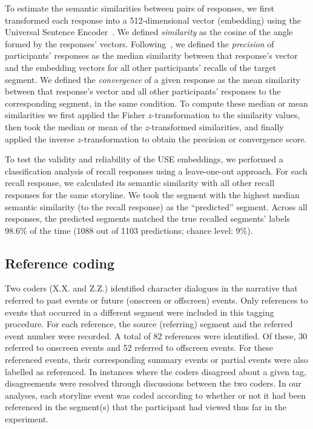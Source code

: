 \documentclass[10pt]{article}
\begin{document}
To estimate the semantic similarities between pairs of responses, we first
transformed each response into a 512-dimensional vector (embedding) using the
Universal Sentence Encoder~\citep[Transformer USE, ][]{CerEtal18}. We defined
\textit{similarity} as the cosine of the angle formed by the responses'
vectors. Following~\cite{HeusEtal21}, we defined the \textit{precision} of
participants' responses as the median similarity between that response's vector
and the embedding vectors for all other participants' recalls of the target
segment. We defined the \textit{convergence} of a given response as the mean
similarity between that response's vector and all other participants' responses
to the corresponding segment, in the same condition. To compute these median or
mean similarities we first applied the Fisher $z$-transformation to the
similarity values, then took the median or mean of the $z$-transformed
similarities, and finally applied the inverse $z$-transformation to obtain the
precision or convergence score.

To test the validity and reliability of the USE embeddings, we performed a
classification analysis of recall responses using a leave-one-out approach. For
each recall response, we calculated its semantic similarity with all other
recall responses for the same storyline. We took the segment with the highest
median semantic similarity (to the recall response) as the ``predicted''
segment. Across all responses, the predicted segments matched the true recalled
segments' labels 98.6\% of the time (1088 out of 1103 predictions; chance
level: 9\%).

\subsection*{Reference coding}

Two coders (X.X. and Z.Z.) identified character dialogues in the narrative that
referred to past events or future (onscreen or offscreen) events. Only
references to events that occurred in a different segment were included in this
tagging procedure. For each reference, the source (referring) segment and the
referred event number were recorded. A total of 82 references were identified.
Of these, 30 referred to onscreen events and 52 referred to offscreen events.
For these referenced events, their corresponding summary events or partial
events were also labelled as referenced. In instances where the coders
disagreed about a given tag, disagreements were resolved through discussions
between the two coders. In our analyses, each storyline event was coded
according to whether or not it had been referenced in the segment(s) that the
participant had viewed thus far in the experiment.
\end{document}
